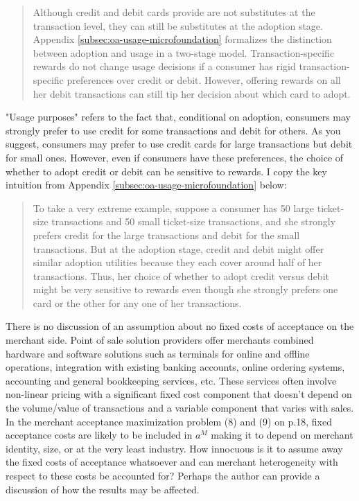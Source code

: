 \documentclass[main.tex]{subfiles}
\begin{document}
\begin{refsection}
\begin{quotation}
    Although credit and debit cards provide are not substitutes at the transaction level, they can still be substitutes at the adoption stage.
    Appendix \ref{subsec:oa-usage-microfoundation} formalizes the distinction between adoption and usage in a two-stage model.
Transaction-specific rewards do not change usage decisions if a consumer has rigid transaction-specific preferences over credit or debit.
However, offering rewards on all her debit transactions can still tip her decision about which card to adopt.
\end{quotation}

"Usage purposes" refers to the fact that, conditional on adoption, consumers may strongly prefer to use credit for some transactions and debit for others.
As you suggest, consumers may prefer to use credit cards for large transactions but debit for small ones.
However, even if consumers have these preferences, the choice of whether to adopt credit or debit can be sensitive to rewards.
I copy the key intuition from Appendix \ref{subsec:oa-usage-microfoundation} below:

\begin{quote}
    To take a very extreme example, suppose a consumer has 50 large ticket-size transactions and 50 small ticket-size transactions, and she strongly prefers credit for the large transactions and debit for the small transactions.
But at the adoption stage, credit and debit might offer similar adoption utilities because they each cover around half of her transactions.
Thus, her choice of whether to adopt credit versus debit might be very sensitive to rewards even though she strongly prefers one card or the other for any one of her transactions.
\end{quote}

\begin{refcomment}
There is no discussion of an assumption about no fixed costs of acceptance on the merchant side.
Point of sale solution providers offer merchants combined hardware and software solutions such as terminals for online and offline operations, integration with existing banking accounts, online ordering systems, accounting and general bookkeeping services, etc.
These services often involve non-linear pricing with a significant fixed cost component that doesn't depend on the volume/value of transactions and a variable component that varies with sales.
In the merchant acceptance maximization problem (8) and (9) on p.18, fixed acceptance costs are likely to be included in \(a^M\) making it to depend on merchant identity, size, or at the very least industry.
How innocuous is it to assume away the fixed costs of acceptance whatsoever and can merchant heterogeneity with respect to these costs be accounted for?
Perhaps the author can provide a discussion of how the results may be affected.
\end{refcomment}


\end{refsection}
\end{document}
